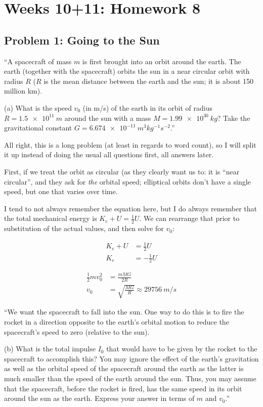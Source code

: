 \documentclass[8.01x]{subfiles}
\begin{document}
\chapter{Weeks 10+11: Homework 8}

\section{Problem 1: Going to the Sun}

``A spacecraft of mass $m$ is first brought into an orbit around the earth. The earth (together with the spacecraft) orbits the sun in a near circular orbit with radius $R$ ($R$ is the mean distance between the earth and the sun; it is about 150 million km).

(a) What is the speed $v_0$ (in m/s) of the earth in its orbit of radius $R = \SI{1.5e11}{m}$ around the sun with a mass $M=\SI{1.99e30}{kg}$? Take the gravitational constant $G=\SI{6.674e-11}{m^3 kg^{-1} s^{-2}}$.''

All right, this is a long problem (at least in regards to word count), so I will split it up instead of doing the usual all questions first, all answers later.

First, if we treat the orbit as circular (as they clearly want us to: it is ``near circular'', and they ask for \emph{the} orbital speed; elliptical orbits don't have a single speed, but one that varies over time.

I tend to not always remember the equation here, but I do always remember that the total mechanical energy is $\displaystyle K_e + U = \frac{1}{2} U$. We can rearrange that prior to substitution of the actual values, and then solve for $v_0$:

\begin{align}
K_e + U &= \frac{1}{2} U\\
K_e &= -\frac{1}{2} U
\end{align}

\begin{align}
\frac{1}{2} m v_0^2 &= \frac{m M G}{2R}\\
v_0 &= \sqrt{\frac{M G}{R}} \approx \SI{29756}{m/s}
\end{align}

``We want the spacecraft to fall into the sun. One way to do this is to fire the rocket in a direction opposite to the earth's orbital motion to reduce the spacecraft's speed to zero (relative to the sun).

(b) What is the total impulse $I_0$ that would have to be given by the rocket to the spacecraft to accomplish this? You may ignore the effect of the earth's gravitation as well as the orbital speed of the spacecraft around the earth as the latter is much smaller than the speed of the earth around the sun. Thus, you may assume that the spacecraft, before the rocket is fired, has the same speed in its orbit around the sun as the earth. Express your answer in terms of $m$ and $v_0$.''
\end{document}

